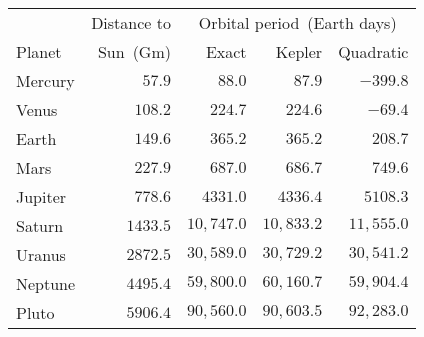 \begin{tabular}{lrrrr}                                                 \toprule
        & Distance to & \multicolumn{3}{c}{Orbital period~(Earth days)} \\
  \cmidrule{3-5}
Planet  & Sun~(Gm)    & Exact  & Kepler     & Quadratic  \\\midrule
Mercury & $57.9$               & $88.0$     & $87.9$     & $-399.8$   \\[4pt]
Venus   & $108.2$              & $224.7$    & $224.6$    & $-69.4$    \\[4pt]
Earth   & $149.6$              & $365.2$    & $365.2$    & $208.7$    \\[4pt]
Mars    & $227.9$              & $687.0$    & $686.7$    & $749.6$    \\[4pt]
Jupiter & $778.6$              & $4331.0$   & $4336.4$   & $5108.3$   \\[4pt]
Saturn  & $1433.5$             & $10,747.0$ & $10,833.2$ & $11,555.0$ \\[4pt]
Uranus  & $2872.5$             & $30,589.0$ & $30,729.2$ & $30,541.2$ \\[4pt]
Neptune & $4495.4$             & $59,800.0$ & $60,160.7$ & $59,904.4$ \\[4pt]
Pluto   & $5906.4$             & $90,560.0$ & $90,603.5$ & $92,283.0$ \\\bottomrule
\end{tabular}
